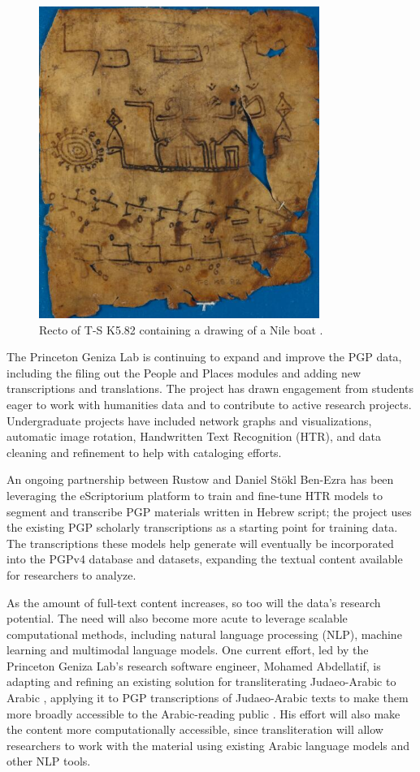 \documentclass{article}
\begin{document}
\begin{figure}[!hbt]
  \includegraphics[height=4in]{MS_TS-K-5-2_detail.jpg}
  \centering
  \caption{Recto of T-S K5.82 containing a drawing of a Nile boat \autocite{noauthor_paraliterary_nodate}.}
  \label{fig:pgpid8483}
\end{figure}

 The Princeton Geniza Lab is continuing to expand and improve the PGP data, including the filing out the People and Places modules and adding new transcriptions and translations. The project has drawn engagement from students eager to work with humanities data and to contribute to active research projects. Undergraduate projects have included network graphs and visualizations, automatic image rotation, Handwritten Text Recognition (HTR), and data cleaning and refinement to help with cataloging efforts. 

An ongoing partnership between Rustow and Daniel Stökl Ben-Ezra \autocite{noauthor_handwritten_nodate} has been leveraging the eScriptorium platform to train and fine-tune HTR models to segment and transcribe PGP materials written in Hebrew script; the project uses the existing PGP scholarly transcriptions as a starting point for training data. The transcriptions these models help generate will eventually be incorporated into the PGPv4 database and datasets, expanding the textual content available for researchers to analyze.

As the amount of full-text content increases, so too will the data’s research potential. The need will also become more acute to leverage scalable computational methods, including natural language processing (NLP), machine learning and multimodal language models. One current effort, led by the Princeton Geniza Lab’s research software engineer, Mohamed Abdellatif, is adapting and refining an existing solution for transliterating Judaeo-Arabic to Arabic \autocite{weisberg_mitelman_code-switching_2024}, applying it to PGP transcriptions of Judaeo-Arabic texts to make them more broadly accessible to the Arabic-reading public \autocite{abdellatif_machine_2025}. His effort will also make the content more computationally accessible, since transliteration will allow researchers to work with the material using existing Arabic language models and other NLP tools.
\end{document}
